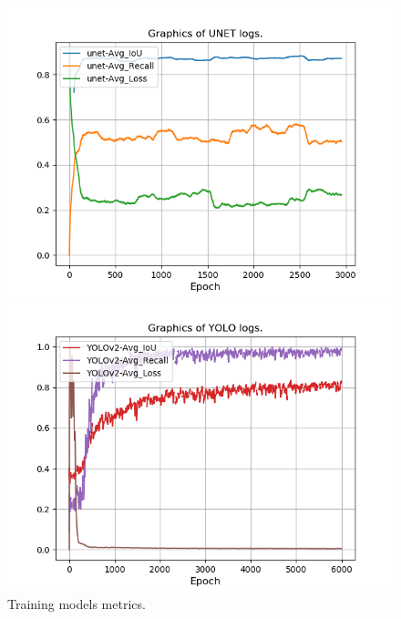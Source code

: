 \documentclass{article} %
\begin{document}
\begin{figure}[h]
\begin{center}
    \begin{minipage}{0.50\textwidth}
        \centering
        \includegraphics[width=\linewidth]{images/unet-256_2561.png}
     \end{minipage}\hfill
    \begin{minipage}{0.50\textwidth}
        \includegraphics[width=\linewidth]{images/YOLOv2-1024_10245.png}
    \end{minipage}
\end{center}
\caption{Training models metrics.}
\end{figure}
\end{document}
